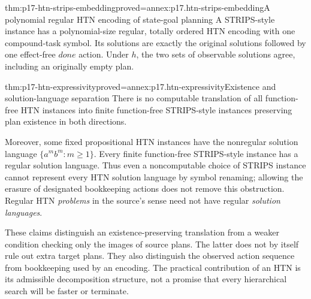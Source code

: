 \begin{hbtheorem}{thm:p17-htn-strips-embedding}{proved=annex:p17.htn-strips-embedding}{A polynomial regular HTN encoding of state-goal planning}
A STRIPS-style instance has a polynomial-size regular, totally ordered HTN
encoding with one compound-task symbol. Its solutions are exactly the original
solutions followed by one effect-free \(\mathit{done}\) action. Under \(h\),
the two sets of observable solutions agree, including an originally empty plan.
\end{hbtheorem}

\begin{hbtheorem}{thm:p17-htn-expressivity}{proved=annex:p17.htn-expressivity}{Existence and solution-language separation}
There is no computable translation of all function-free HTN instances into
finite function-free STRIPS-style instances preserving plan existence in both
directions.

Moreover, some fixed propositional HTN instances have the nonregular solution
language \(\{a^m b^m:m\geq1\}\). Every finite function-free STRIPS-style
instance has a regular solution language. Thus even a noncomputable choice
of STRIPS instance cannot represent every HTN solution language by symbol
renaming; allowing the erasure of designated bookkeeping actions does not
remove this obstruction. Regular HTN \emph{problems} in the source's sense
need not have regular \emph{solution languages}.
\end{hbtheorem}

These claims distinguish an existence-preserving translation from a weaker
condition checking only the images of source plans. The latter does not by
itself rule out extra target plans. They also distinguish the observed action
sequence from bookkeeping used by an encoding. The practical contribution of
an HTN is its admissible decomposition structure, not a promise that every
hierarchical search will be faster or terminate.

